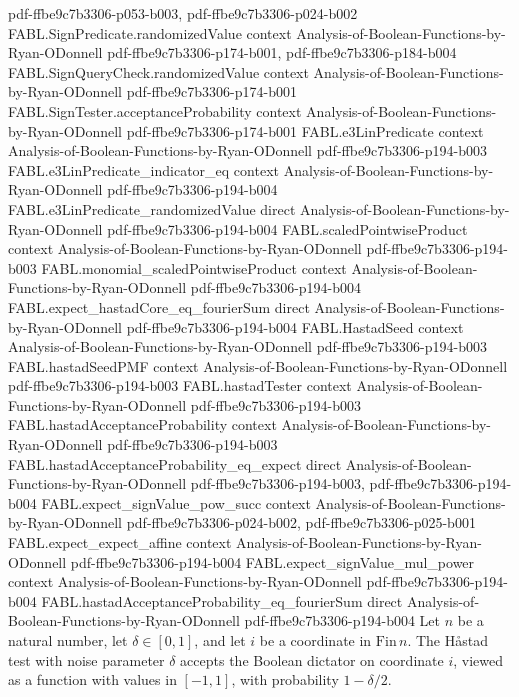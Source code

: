\begin{theorem}
  {pdf-ffbe9c7b3306-p053-b003,
    pdf-ffbe9c7b3306-p024-b002}
\proofstep
  {FABL.SignPredicate.randomizedValue}
  {context}
  {Analysis-of-Boolean-Functions-by-Ryan-ODonnell}
  {pdf-ffbe9c7b3306-p174-b001,
    pdf-ffbe9c7b3306-p184-b004}
\proofstep
  {FABL.SignQueryCheck.randomizedValue}
  {context}
  {Analysis-of-Boolean-Functions-by-Ryan-ODonnell}
  {pdf-ffbe9c7b3306-p174-b001}
\proofstep
  {FABL.SignTester.acceptanceProbability}
  {context}
  {Analysis-of-Boolean-Functions-by-Ryan-ODonnell}
  {pdf-ffbe9c7b3306-p174-b001}
\proofstep
  {FABL.e3LinPredicate}
  {context}
  {Analysis-of-Boolean-Functions-by-Ryan-ODonnell}
  {pdf-ffbe9c7b3306-p194-b003}
\proofstep
  {FABL.e3LinPredicate_indicator_eq}
  {context}
  {Analysis-of-Boolean-Functions-by-Ryan-ODonnell}
  {pdf-ffbe9c7b3306-p194-b004}
\proofstep
  {FABL.e3LinPredicate_randomizedValue}
  {direct}
  {Analysis-of-Boolean-Functions-by-Ryan-ODonnell}
  {pdf-ffbe9c7b3306-p194-b004}
\proofstep
  {FABL.scaledPointwiseProduct}
  {context}
  {Analysis-of-Boolean-Functions-by-Ryan-ODonnell}
  {pdf-ffbe9c7b3306-p194-b003}
\proofstep
  {FABL.monomial_scaledPointwiseProduct}
  {context}
  {Analysis-of-Boolean-Functions-by-Ryan-ODonnell}
  {pdf-ffbe9c7b3306-p194-b004}
\proofstep
  {FABL.expect_hastadCore_eq_fourierSum}
  {direct}
  {Analysis-of-Boolean-Functions-by-Ryan-ODonnell}
  {pdf-ffbe9c7b3306-p194-b004}
\proofstep
  {FABL.HastadSeed}
  {context}
  {Analysis-of-Boolean-Functions-by-Ryan-ODonnell}
  {pdf-ffbe9c7b3306-p194-b003}
\proofstep
  {FABL.hastadSeedPMF}
  {context}
  {Analysis-of-Boolean-Functions-by-Ryan-ODonnell}
  {pdf-ffbe9c7b3306-p194-b003}
\proofstep
  {FABL.hastadTester}
  {context}
  {Analysis-of-Boolean-Functions-by-Ryan-ODonnell}
  {pdf-ffbe9c7b3306-p194-b003}
\proofstep
  {FABL.hastadAcceptanceProbability}
  {context}
  {Analysis-of-Boolean-Functions-by-Ryan-ODonnell}
  {pdf-ffbe9c7b3306-p194-b003}
\proofstep
  {FABL.hastadAcceptanceProbability_eq_expect}
  {direct}
  {Analysis-of-Boolean-Functions-by-Ryan-ODonnell}
  {pdf-ffbe9c7b3306-p194-b003,
    pdf-ffbe9c7b3306-p194-b004}
\proofstep
  {FABL.expect_signValue_pow_succ}
  {context}
  {Analysis-of-Boolean-Functions-by-Ryan-ODonnell}
  {pdf-ffbe9c7b3306-p024-b002,
    pdf-ffbe9c7b3306-p025-b001}
\proofstep
  {FABL.expect_expect_affine}
  {context}
  {Analysis-of-Boolean-Functions-by-Ryan-ODonnell}
  {pdf-ffbe9c7b3306-p194-b004}
\proofstep
  {FABL.expect_signValue_mul_power}
  {context}
  {Analysis-of-Boolean-Functions-by-Ryan-ODonnell}
  {pdf-ffbe9c7b3306-p194-b004}
\proofstep
  {FABL.hastadAcceptanceProbability_eq_fourierSum}
  {direct}
  {Analysis-of-Boolean-Functions-by-Ryan-ODonnell}
  {pdf-ffbe9c7b3306-p194-b004}
Let $n$ be a natural number, let $\delta\in[0,1]$, and let $i$ be a coordinate in
$\mathrm{Fin}\,n$. The Håstad test with noise parameter $\delta$ accepts the Boolean
dictator on coordinate $i$, viewed as a function with values in $[-1,1]$, with
probability $1-\delta/2$.
\end{theorem}


